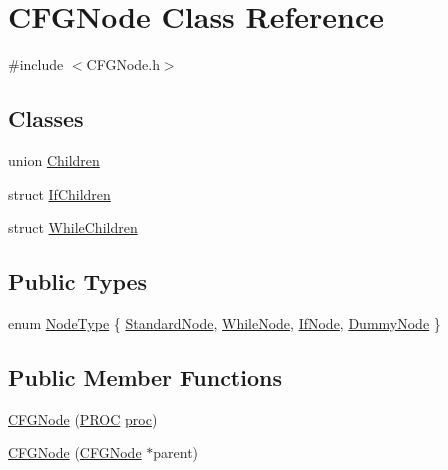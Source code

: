 \hypertarget{class_c_f_g_node}{\section{C\-F\-G\-Node Class Reference}
\label{class_c_f_g_node}
}


{\ttfamily \#include $<$C\-F\-G\-Node.\-h$>$}

\subsection*{Classes}
\begin{DoxyCompactItemize}
\item 
union \hyperlink{union_c_f_g_node_1_1_children}{Children}
\item 
struct \hyperlink{struct_c_f_g_node_1_1_if_children}{If\-Children}
\item 
struct \hyperlink{struct_c_f_g_node_1_1_while_children}{While\-Children}
\end{DoxyCompactItemize}
\subsection*{Public Types}
\begin{DoxyCompactItemize}
\item 
enum \hyperlink{class_c_f_g_node_aa0933713506a9c0226e705703ee5b079}{Node\-Type} \{ \hyperlink{class_c_f_g_node_aa0933713506a9c0226e705703ee5b079aa2e8603898955894b9dee1c4357f7438}{Standard\-Node}, 
\hyperlink{class_c_f_g_node_aa0933713506a9c0226e705703ee5b079ade6fc811a65caa8511c48b93134a90e7}{While\-Node}, 
\hyperlink{class_c_f_g_node_aa0933713506a9c0226e705703ee5b079a12589e59a33dfed127168c3663a6e52e}{If\-Node}, 
\hyperlink{class_c_f_g_node_aa0933713506a9c0226e705703ee5b079a653298400dbc11a4a806566fc8da20d3}{Dummy\-Node}
 \}
\end{DoxyCompactItemize}
\subsection*{Public Member Functions}
\begin{DoxyCompactItemize}
\item 
\hyperlink{class_c_f_g_node_a983d5734f9d9be76b3646e0552227fb3}{C\-F\-G\-Node} (\hyperlink{std_afx_8h_aa07ea1d188c7b45668f1bd82ffd6d87e}{P\-R\-O\-C} \hyperlink{class_c_f_g_node_a4c29d551dc1b8ac7465ebf4ddd1e3437}{proc})
\item 
\hyperlink{class_c_f_g_node_ae6ffc17945277e377f8c8a14e140a641}{C\-F\-G\-Node} (\hyperlink{class_c_f_g_node}{C\-F\-G\-Node} $\ast$parent)
\end{DoxyCompactItemize}

